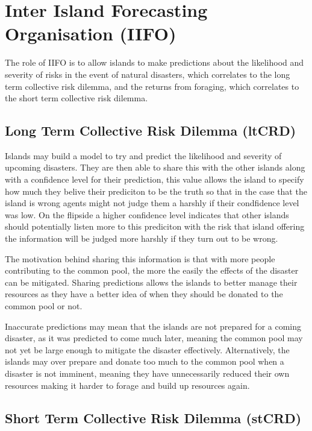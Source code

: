 \chapter{Inter Island Forecasting Organisation (IIFO)}

The role of IIFO is to allow islands to make predictions about the likelihood and severity of risks in the event of natural disasters, which correlates to the long term collective risk dilemma, and the returns from foraging, which correlates to the short term collective risk dilemma.

\section{Long Term Collective Risk Dilemma (ltCRD)}
\label{sec:IIFO:ltCRD}

Islands may build a model to try and predict the likelihood and severity of upcoming disasters. They are then able to share this with the other islands along with a confidence level for their prediction, this value allows the island to specify how much they belive their prediciton to be the truth so that in the case that the island is wrong agents might not judge them a harshly if their condfidence level was low. On the flipside a higher confidence level indicates that other islands should potentially listen more to this prediciton with the risk that island offering the information will be judged more harshly if they turn out to be wrong. 

The motivation behind sharing this information is that with more people contributing to the common pool, the more the easily the effects of the disaster can be mitigated. Sharing predictions allows the islands to better manage their resources as they have a better idea of when they should be donated to the common pool or not.

Inaccurate predictions may mean that the islands are not prepared for a coming disaster, as it was predicted to come much later, meaning the common pool may not yet be large enough to mitigate the disaster effectively. Alternatively, the islands may over prepare and donate too much to the common pool when a disaster is not imminent, meaning they have unnecessarily reduced their own resources making it harder to forage and build up resources again.

\section{Short Term Collective Risk Dilemma (stCRD)}
\label{sec:IIFO:stCRD}

